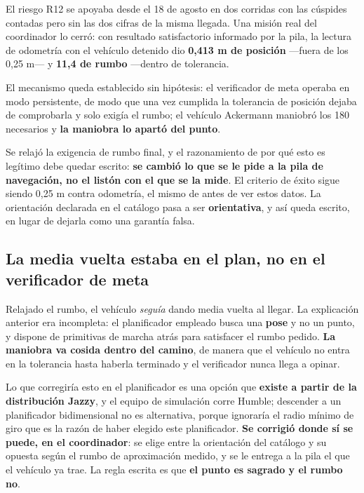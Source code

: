 \documentclass[12pt,letterpaper]{article}
\begin{document}
El riesgo R12 se apoyaba desde el 18 de agosto en dos corridas con las cúspides contadas pero sin las dos cifras de la misma llegada. Una misión real del coordinador lo cerró: con resultado satisfactorio informado por la pila, la lectura de odometría con el vehículo detenido dio \textbf{0,413 m de posición} ---fuera de los 0,25 m--- y \textbf{11,4\textdegree{} de rumbo} ---dentro de tolerancia.

El mecanismo queda establecido sin hipótesis: el verificador de meta operaba en modo persistente, de modo que una vez cumplida la tolerancia de posición dejaba de comprobarla y solo exigía el rumbo; el vehículo Ackermann maniobró los 180\textdegree{} necesarios y \textbf{la maniobra lo apartó del punto}.

Se relajó la exigencia de rumbo final, y el razonamiento de por qué esto es legítimo debe quedar escrito: \textbf{se cambió lo que se le pide a la pila de navegación, no el listón con el que se la mide}. El criterio de éxito sigue siendo 0,25 m contra odometría, el mismo de antes de ver estos datos. La orientación declarada en el catálogo pasa a ser \textbf{orientativa}, y así queda escrito, en lugar de dejarla como una garantía falsa.

\subsection{La media vuelta estaba en el plan, no en el verificador de meta}

Relajado el rumbo, el vehículo \emph{seguía} dando media vuelta al llegar. La explicación anterior era incompleta: el planificador empleado busca una \textbf{pose} y no un punto, y dispone de primitivas de marcha atrás para satisfacer el rumbo pedido. \textbf{La maniobra va cosida dentro del camino}, de manera que el vehículo no entra en la tolerancia hasta haberla terminado y el verificador nunca llega a opinar.

Lo que corregiría esto en el planificador es una opción que \textbf{existe a partir de la distribución Jazzy}, y el equipo de simulación corre Humble; descender a un planificador bidimensional no es alternativa, porque ignoraría el radio mínimo de giro que es la razón de haber elegido este planificador. \textbf{Se corrigió donde sí se puede, en el coordinador}: se elige entre la orientación del catálogo y su opuesta según el rumbo de aproximación medido, y se le entrega a la pila el que el vehículo ya trae. La regla escrita es que \textbf{el punto es sagrado y el rumbo no}.
\end{document}

